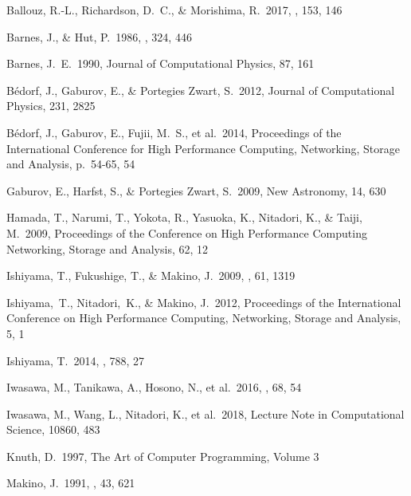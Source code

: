\documentclass[dvipdfmx]{pasj01}
\begin{document}
\begin{thebibliography}{}

 Ballouz, R.-L., Richardson, D.~C., \& Morishima, R.\ 2017, \aj, 153, 146  
  
 Barnes, J., \& Hut, P.\ 1986, \nat, 324, 446

 Barnes, J.~E.\ 1990, Journal of Computational Physics, 87, 161
  
 B{\'e}dorf, J., Gaburov, E., \& Portegies Zwart, S.\ 2012, Journal of Computational Physics, 231, 2825 
  
 B{\'e}dorf, J., Gaburov, E., Fujii, M.~S., et al.\ 2014, Proceedings of the International Conference for High Performance Computing, Networking, Storage and Analysis, p.~54-65, 54

 Gaburov, E., Harfst, S., \& Portegies Zwart, S.\ 2009, New Astronomy, 14, 630

  
 Hamada, T., Narumi, T., Yokota, R., Yasuoka, K., Nitadori, K., \& Taiji, M.\ 2009, Proceedings of the Conference on High Performance
  Computing Networking, Storage and Analysis, 62, 12

 Ishiyama, T., Fukushige, T., \& Makino, J.\ 2009, \pasj, 61, 1319
  
  Ishiyama,~T., Nitadori,~K., \& Makino, J.\ 2012, Proceedings of the
  International Conference on High Performance Computing, Networking,
  Storage and Analysis, 5, 1
  
 Ishiyama, T.\ 2014, \apj, 788, 27

 Iwasawa, M., Tanikawa, A.,
  Hosono, N., et al.\ 2016, \pasj, 68, 54

 Iwasawa, M., Wang, L.,
  Nitadori, K., et al.\ 2018, Lecture Note in Computational Science,
  10860, 483

 Knuth, D.\ 1997, The Art of Computer Programming, Volume 3
  
 Makino, J.\ 1991, \pasj, 43, 621 
  

\end{thebibliography}
\end{document}
